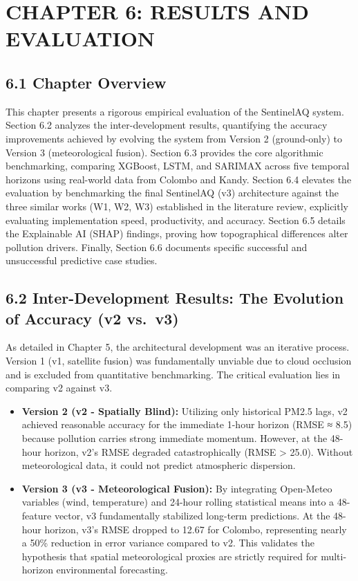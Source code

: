 \chapter{CHAPTER 6: RESULTS AND
EVALUATION}\label{chapter-6-results-and-evaluation}

\section{6.1 Chapter Overview}\label{chapter-overview}

This chapter presents a rigorous empirical evaluation of the SentinelAQ
system. Section 6.2 analyzes the inter-development results, quantifying
the accuracy improvements achieved by evolving the system from Version 2
(ground-only) to Version 3 (meteorological fusion). Section 6.3 provides
the core algorithmic benchmarking, comparing XGBoost, LSTM, and SARIMAX
across five temporal horizons using real-world data from Colombo and
Kandy. Section 6.4 elevates the evaluation by benchmarking the final
SentinelAQ (v3) architecture against the three similar works (W1, W2,
W3) established in the literature review, explicitly evaluating
implementation speed, productivity, and accuracy. Section 6.5 details
the Explainable AI (SHAP) findings, proving how topographical
differences alter pollution drivers. Finally, Section 6.6 documents
specific successful and unsuccessful predictive case studies.

\section{6.2 Inter-Development Results: The Evolution of Accuracy (v2
vs.~v3)}\label{inter-development-results-the-evolution-of-accuracy-v2-vs.-v3}

As detailed in Chapter 5, the architectural development was an iterative
process. Version 1 (v1, satellite fusion) was fundamentally unviable due
to cloud occlusion and is excluded from quantitative benchmarking. The
critical evaluation lies in comparing v2 against v3.

\begin{itemize}
\tightlist
\item
  \textbf{Version 2 (v2 - Spatially Blind):} Utilizing only historical
  PM2.5 lags, v2 achieved reasonable accuracy for the immediate 1-hour
  horizon (RMSE ≈ 8.5) because pollution carries strong immediate
  momentum. However, at the 48-hour horizon, v2's RMSE degraded
  catastrophically (RMSE \textgreater{} 25.0). Without meteorological
  data, it could not predict atmospheric dispersion.
\item
  \textbf{Version 3 (v3 - Meteorological Fusion):} By integrating
  Open-Meteo variables (wind, temperature) and 24-hour rolling
  statistical means into a 48-feature vector, v3 fundamentally
  stabilized long-term predictions. At the 48-hour horizon, v3's RMSE
  dropped to 12.67 for Colombo, representing nearly a 50\% reduction in
  error variance compared to v2. This validates the hypothesis that
  spatial meteorological proxies are strictly required for multi-horizon
  environmental forecasting.
\end{itemize}


